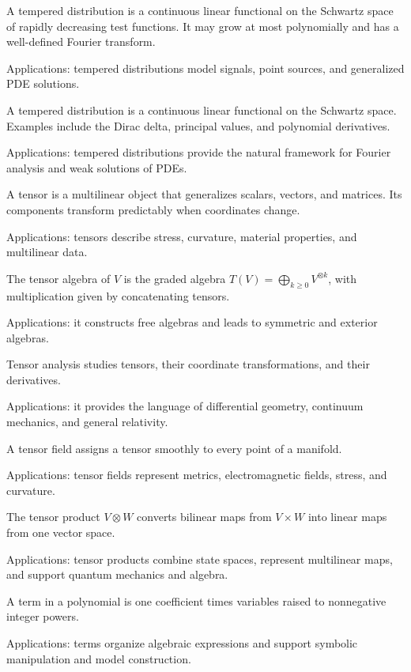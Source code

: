 A tempered distribution is a continuous linear functional on the Schwartz space of rapidly decreasing test functions. It may grow at most polynomially and has a well-defined Fourier transform. \par\noindent Applications: tempered distributions model signals, point sources, and generalized PDE solutions.

A tempered distribution is a continuous linear functional on the Schwartz space. Examples include the Dirac delta, principal values, and polynomial derivatives. \par\noindent Applications: tempered distributions provide the natural framework for Fourier analysis and weak solutions of PDEs.

A tensor is a multilinear object that generalizes scalars, vectors, and matrices. Its components transform predictably when coordinates change. \par\noindent Applications: tensors describe stress, curvature, material properties, and multilinear data.

The tensor algebra of $V$ is the graded algebra $T(V)=\bigoplus_{k\ge0}V^{\otimes k}$, with multiplication given by concatenating tensors. \par\noindent Applications: it constructs free algebras and leads to symmetric and exterior algebras.

Tensor analysis studies tensors, their coordinate transformations, and their derivatives. \par\noindent Applications: it provides the language of differential geometry, continuum mechanics, and general relativity.

A tensor field assigns a tensor smoothly to every point of a manifold. \par\noindent Applications: tensor fields represent metrics, electromagnetic fields, stress, and curvature.

The tensor product $V\otimes W$ converts bilinear maps from $V\times W$ into linear maps from one vector space. \par\noindent Applications: tensor products combine state spaces, represent multilinear maps, and support quantum mechanics and algebra.

A term in a polynomial is one coefficient times variables raised to nonnegative integer powers. \par\noindent Applications: terms organize algebraic expressions and support symbolic manipulation and model construction.

